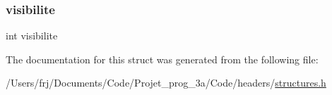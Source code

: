 \subsubsection{\texorpdfstring{visibilite}{visibilite}}
{\footnotesize\ttfamily int visibilite}



The documentation for this struct was generated from the following file\+:\begin{DoxyCompactItemize}
\item 
/\+Users/frj/\+Documents/\+Code/\+Projet\+\_\+prog\+\_\+3a/\+Code/headers/\hyperlink{structures_8h}{structures.\+h}\end{DoxyCompactItemize}
